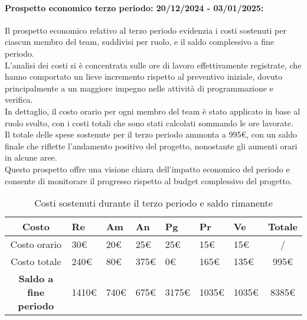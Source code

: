 \paragraph{Prospetto economico terzo periodo: 20/12/2024 - 03/01/2025: }
Il prospetto economico relativo al terzo periodo evidenzia i costi sostenuti per ciascun membro del team, suddivisi per ruolo, e il saldo complessivo a fine periodo.\\
L'analisi dei costi si è concentrata sulle ore di lavoro effettivamente registrate, che hanno comportato un lieve incremento rispetto al preventivo iniziale, dovuto principalmente a un maggiore impegno nelle attività di programmazione e verifica. \\
In dettaglio, il costo orario per ogni membro del team è stato applicato in base al ruolo svolto, con i costi totali che sono stati calcolati sommando le ore lavorate. \\
Il totale delle spese sostenute per il terzo periodo ammonta a 995€, con un saldo finale che riflette l'andamento positivo del progetto, nonostante gli aumenti orari in alcune aree.\\
Questo prospetto offre una visione chiara dell'impatto economico del periodo e consente di monitorare il progresso rispetto al budget complessivo del progetto.

\begin{table}[!h]
    \centering
    \renewcommand{\arraystretch}{1.5}
    \begin{tabularx}{\textwidth}{|c|X|X|X|X|X|X|c|}\hline
    \rowcolor[HTML]{FFD700} 
    \textbf{Costo} & \textbf{Re} & \textbf{Am} & \textbf{An} & \textbf{Pg} & \textbf{Pr} & \textbf{Ve} & \textbf{Totale} \\ \hline
    Costo orario & 30€ & 20€ & 25€ & 25€ & 15€ & 15€ & /  \\ \hline
    Costo totale & 240€ & 80€ & 375€ & 0€ & 165€ & 135€ & 995€ \\ \hline
    \rowcolor[HTML]{FFD700} 
    \textbf{Saldo a fine periodo}  & 1410€ & 740€  & 675€ & 3175€ & 1035€ & 1035€ & 8385€ \\ \hline
    \end{tabularx}
    \caption{Costi sostenuti durante il terzo periodo e saldo rimanente}
\end{table}

